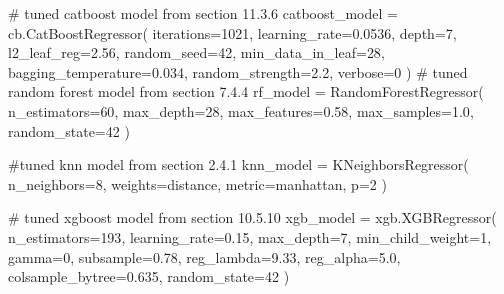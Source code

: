 \documentclass[
  letterpaper,
  DIV=11,
  numbers=noendperiod]{scrreprt}
\newenvironment{Shaded}{\begin{snugshade}}{\end{snugshade}}
\newcommand{\CommentTok}[1]{\textcolor[rgb]{0.37,0.37,0.37}{#1}}
\newcommand{\DecValTok}[1]{\textcolor[rgb]{0.68,0.00,0.00}{#1}}
\newcommand{\FloatTok}[1]{\textcolor[rgb]{0.68,0.00,0.00}{#1}}
\newcommand{\NormalTok}[1]{\textcolor[rgb]{0.00,0.23,0.31}{#1}}
\newcommand{\OperatorTok}[1]{\textcolor[rgb]{0.37,0.37,0.37}{#1}}
\newcommand{\StringTok}[1]{\textcolor[rgb]{0.13,0.47,0.30}{#1}}
\begin{document}
\begin{Shaded}
\begin{Highlighting}[]
\CommentTok{\# tuned catboost model from section 11.3.6}
\NormalTok{catboost\_model }\OperatorTok{=}\NormalTok{ cb.CatBoostRegressor(}
\NormalTok{    iterations}\OperatorTok{=}\DecValTok{1021}\NormalTok{,}
\NormalTok{    learning\_rate}\OperatorTok{=}\FloatTok{0.0536}\NormalTok{,}
\NormalTok{    depth}\OperatorTok{=}\DecValTok{7}\NormalTok{,}
\NormalTok{    l2\_leaf\_reg}\OperatorTok{=}\FloatTok{2.56}\NormalTok{,}
\NormalTok{    random\_seed}\OperatorTok{=}\DecValTok{42}\NormalTok{,}
\NormalTok{    min\_data\_in\_leaf}\OperatorTok{=}\DecValTok{28}\NormalTok{,}
\NormalTok{    bagging\_temperature}\OperatorTok{=}\FloatTok{0.034}\NormalTok{,}
\NormalTok{    random\_strength}\OperatorTok{=}\FloatTok{2.2}\NormalTok{,}
\NormalTok{    verbose}\OperatorTok{=}\DecValTok{0}
\NormalTok{)}
\CommentTok{\# tuned random forest model from section 7.4.4}
\NormalTok{rf\_model }\OperatorTok{=}\NormalTok{ RandomForestRegressor(}
\NormalTok{    n\_estimators}\OperatorTok{=}\DecValTok{60}\NormalTok{,}
\NormalTok{    max\_depth}\OperatorTok{=}\DecValTok{28}\NormalTok{,}
\NormalTok{    max\_features}\OperatorTok{=}\FloatTok{0.58}\NormalTok{,}
\NormalTok{    max\_samples}\OperatorTok{=}\FloatTok{1.0}\NormalTok{,}
\NormalTok{    random\_state}\OperatorTok{=}\DecValTok{42}
\NormalTok{)}

\CommentTok{\#tuned knn model from section 2.4.1}
\NormalTok{knn\_model }\OperatorTok{=}\NormalTok{ KNeighborsRegressor(}
\NormalTok{    n\_neighbors}\OperatorTok{=}\DecValTok{8}\NormalTok{,}
\NormalTok{    weights}\OperatorTok{=}\StringTok{\textquotesingle{}distance\textquotesingle{}}\NormalTok{,}
\NormalTok{    metric}\OperatorTok{=}\StringTok{\textquotesingle{}manhattan\textquotesingle{}}\NormalTok{,}
\NormalTok{    p}\OperatorTok{=}\DecValTok{2}
\NormalTok{)}

\CommentTok{\# tuned xgboost model from section  10.5.10}
\NormalTok{xgb\_model }\OperatorTok{=}\NormalTok{ xgb.XGBRegressor(}
\NormalTok{    n\_estimators}\OperatorTok{=}\DecValTok{193}\NormalTok{,}
\NormalTok{    learning\_rate}\OperatorTok{=}\FloatTok{0.15}\NormalTok{,}
\NormalTok{    max\_depth}\OperatorTok{=}\DecValTok{7}\NormalTok{,}
\NormalTok{    min\_child\_weight}\OperatorTok{=}\DecValTok{1}\NormalTok{,}
\NormalTok{    gamma}\OperatorTok{=}\DecValTok{0}\NormalTok{,}
\NormalTok{    subsample}\OperatorTok{=}\FloatTok{0.78}\NormalTok{,}
\NormalTok{    reg\_lambda}\OperatorTok{=}\FloatTok{9.33}\NormalTok{,}
\NormalTok{    reg\_alpha}\OperatorTok{=}\FloatTok{5.0}\NormalTok{,}
\NormalTok{    colsample\_bytree}\OperatorTok{=}\FloatTok{0.635}\NormalTok{,}
\NormalTok{    random\_state}\OperatorTok{=}\DecValTok{42}
\NormalTok{)}
\end{Highlighting}
\end{Shaded}
\end{document}
